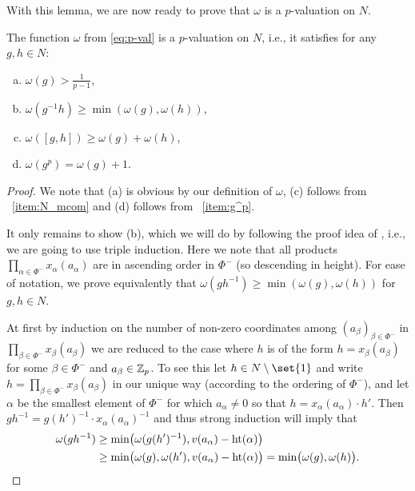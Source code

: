 With this lemma, we are now ready to prove that $\omega$ is a $p$-valuation on $N$.

\begin{proposition}\label{prop:N-p-val}
  The function $\omega$ from \eqref{eq:p-val} is a $p$-valuation on $N$, i.e., it satisfies for any $g,h \in N$:
  \begin{enumerate}[(a)]
  \item $\omega(g) > \frac{1}{p-1}$,
  \item $\omega(g^{-1}h) \geq \min(\omega(g),\omega(h))$,
  \item $\omega([g,h]) \geq \omega(g) + \omega(h)$,
  \item $\omega(g^p) = \omega(g) + 1$.
  \end{enumerate}
\end{proposition}
\begin{proof}
  We note that (a) is obvious by our definition of $\omega$, (c) follows from ~\ref{item:N_mcom} and (d) follows from ~\ref{item:g^p}.

  It only remains to show (b), which we will do by following the proof idea of \cite[Lem.~1]{Zab}, i.e., we are going to use triple induction. Here we note that all products $\prod_{\alpha \in \Phi^{-}} x_\alpha(a_\alpha)$ are in ascending order in $\Phi^{-}$ (so descending in height). For ease of notation, we prove equivalently that $\omega(gh^{-1}) \geq \min(\omega(g),\omega(h))$ for $g,h \in N$.

  At first by induction on the number of non-zero coordinates among $(a_{\beta})_{\beta \in \Phi^{-}}$ in $\prod_{\beta \in \Phi^{-}} x_{\beta}(a_{\beta})$ we are reduced to the case where $h$ is of the form $h = x_{\beta}(a_{\beta})$ for some $\beta \in \Phi^{-}$ and $a_{\beta} \in \mathbb{Z}_p$. To see this let $h \in N \setminus \set{1}$ and write $h = \prod_{\beta \in \Phi^{-}} x_{\beta}(a_{\beta})$ in our unique way (according to the ordering of $\Phi^{-}$), and let $\alpha$ be the smallest element of $\Phi^{-}$ for which $a_{\alpha} \neq 0$ so that $h = x_{\alpha}(a_{\alpha}) \cdot h'$. Then $gh^{-1} = g(h')^{-1} \cdot x_{\alpha}(a_{\alpha})^{-1}$ and thus strong induction will imply that
\begin{align*}
  \omega(gh^{-1}) &\geq \min\bigl( \omega(g(h')^{-1}), v(a_{\alpha})-\operatorname{ht}(\alpha)\bigr) \\
  &\geq \min\bigl( \omega(g),\omega(h'), v(a_{\alpha})-\operatorname{ht}(\alpha) \bigr) = \min\bigl( \omega(g),\omega(h) \bigr).
\end{align*}


\end{proof}
